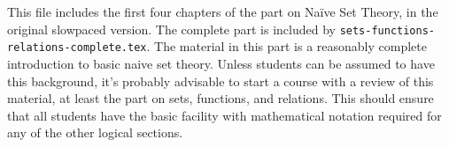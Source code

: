 \documentclass[../../include/open-logic-part]{subfiles}
\begin{document}

  


\begin{editorial}
  This file includes the first four chapters of the part on Na\"ive
  Set Theory, in the original slowpaced version. The complete part is
  included by \verb|sets-functions-relations-complete.tex|. The
  material in this part is a reasonably complete introduction to basic
  naive set theory. Unless students can be assumed to have this
  background, it's probably advisable to start a course with a review
  of this material, at least the part on sets, functions, and
  relations. This should ensure that all students have the basic
  facility with mathematical notation required for any of the other
  logical sections.
\end{editorial}





\OLEndPartHook
\end{document}
